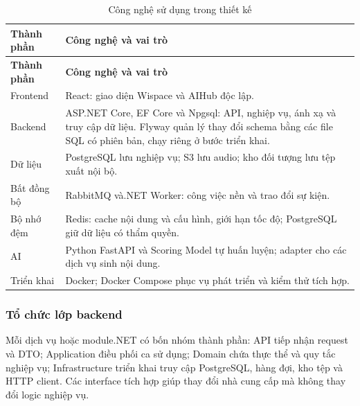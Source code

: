 \begin{longtable}{|>{\raggedright\arraybackslash}p{}|>{\raggedright\arraybackslash}p{}|}

\caption{Công nghệ sử dụng trong thiết kế}\label{design:tab:3}\\\hline

\textbf{Thành phần} & \textbf{Công nghệ và vai trò} \\ \hline

\endfirsthead

\hline

\textbf{Thành phần} & \textbf{Công nghệ và vai trò} \\ \hline

\endhead

Frontend & React: giao diện Wispace và AIHub độc lập. \\ \hline

Backend & ASP.NET Core, EF Core và Npgsql: API, nghiệp vụ, ánh xạ và truy cập dữ liệu. Flyway quản lý thay đổi schema bằng các file SQL có phiên bản, chạy riêng ở bước triển khai. \\ \hline

Dữ liệu & PostgreSQL lưu nghiệp vụ; S3 lưu audio; kho đối tượng lưu tệp xuất nội bộ. \\ \hline

Bất đồng bộ & RabbitMQ và.NET Worker: công việc nền và trao đổi sự kiện. \\ \hline

Bộ nhớ đệm & Redis: cache nội dung và cấu hình, giới hạn tốc độ; PostgreSQL giữ dữ liệu có thẩm quyền. \\ \hline

AI & Python FastAPI và Scoring Model tự huấn luyện; adapter cho các dịch vụ sinh nội dung. \\ \hline

Triển khai & Docker; Docker Compose phục vụ phát triển và kiểm thử tích hợp. \\ \hline

\end{longtable}

\endgroup

\subsubsection{Tổ chức lớp backend}

Mỗi dịch vụ hoặc module.NET có bốn nhóm thành phần: API tiếp nhận request và DTO; Application điều phối ca sử dụng; Domain chứa thực thể và quy tắc nghiệp vụ; Infrastructure triển khai truy cập PostgreSQL, hàng đợi, kho tệp và HTTP client. Các interface tích hợp giúp thay đổi nhà cung cấp mà không thay đổi logic nghiệp vụ.


